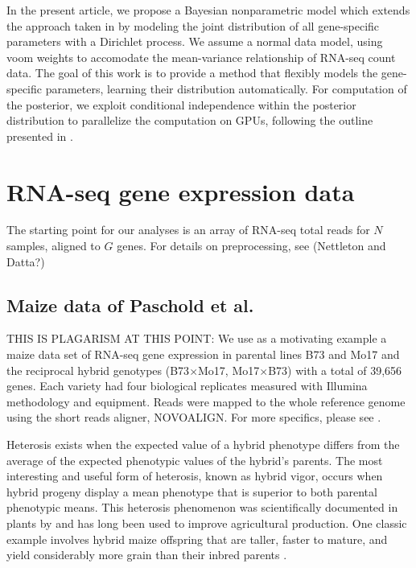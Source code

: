 In the present article, we propose a Bayesian nonparametric model which extends the approach taken in \citet{liu} by modeling the joint distribution of all gene-specific parameters with a Dirichlet process. We assume a normal data model, using voom weights to accomodate the mean-variance relationship of RNA-seq count data. The goal of this work is to provide a method that flexibly models the gene-specific parameters, learning their distribution automatically. For computation of the posterior, we exploit conditional independence within the posterior distribution to parallelize the computation on GPUs, following the outline presented in \citet{suchard}.


\section{RNA-seq gene expression data}
\label{sec:data}
The starting point for our analyses is an array of RNA-seq total reads for $N$ samples, aligned to $G$ genes. For details on preprocessing, see (Nettleton and Datta?) 

\subsection{Maize data of Paschold et al.}
THIS IS PLAGARISM AT THIS POINT:
We use as a motivating example a maize data set \citep{paschold2012complementation} of RNA-seq gene expression in parental lines B73 and Mo17 and the reciprocal hybrid genotypes (B73$\times$Mo17, Mo17$\times$B73) with a total of 39,656 genes. Each variety had four biological replicates measured with Illumina methodology and equipment. Reads were mapped to the whole reference genome using the short reads aligner, NOVOALIGN. For more specifics, please see \cite{paschold2012complementation}.

Heterosis exists when the expected value of a hybrid phenotype differs from the average of the expected phenotypic values of the hybrid's parents.  The most interesting and useful form of heterosis, known as hybrid vigor, occurs when hybrid progeny display a mean phenotype that is superior to  both parental phenotypic means.  This heterosis phenomenon was scientifically documented in plants by \cite{darwin1876effects} and has long been used to improve agricultural production. One classic example involves hybrid maize offspring that are taller, faster to mature, and yield considerably more grain than their inbred parents \citep{hallauer1981quantitative, hallauer2010quantitative}.

